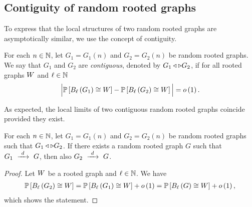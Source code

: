 \subsection{Contiguity of random rooted graphs}
To express that the local structures of two random rooted graphs are asymptotically similar, we use the concept of contiguity.  
\begin{definition}
For each $n\in\mathbb{N}$, let $G_1=G_1(n)$ and $G_2=G_2(n)$ be random rooted graphs. We say that $G_1$ and $G_2$ are {\em contiguous}, denoted by $G_1 \triangleleft \triangleright G_2$, if for all rooted graphs $W$ and $\ell\in\mathbb{N}$
\begin{align*}
\Big|\mathbb{P}\left[B_{\ell}\left(G_1\right)\cong W\right]-\mathbb{P}\left[B_{\ell}\left(G_2\right)\cong W\right]\Big|=o\left(1\right).
\end{align*}
\end{definition}

As expected, the local limits of two contiguous random rooted graphs coincide provided they exist.
\begin{lem}\label{LSlem:contiguous1}
For each $n\in\mathbb{N}$, let $G_1=G_1(n)$ and $G_2=G_2(n)$ be random rooted graphs such that $G_1 \triangleleft \triangleright G_2$. If there exists a random rooted graph $G$ such that $G_1~\xrightarrow{~d~}~G$, then also $G_2~\xrightarrow{~d~}~G$.
\end{lem}
\begin{proof}
Let $W$ be a rooted graph and $\ell\in\mathbb{N}$. We have
\begin{align*}
\mathbb{P}\left[B_{\ell}\left(G_2\right)\cong W\right]=\mathbb{P}\left[B_{\ell}\left(G_1\right)\cong W\right]+o\left(1\right)=\mathbb{P}\left[B_{\ell}\left(G\right)\cong W\right]+o\left(1\right),
\end{align*}
which shows the statement.
\end{proof}

